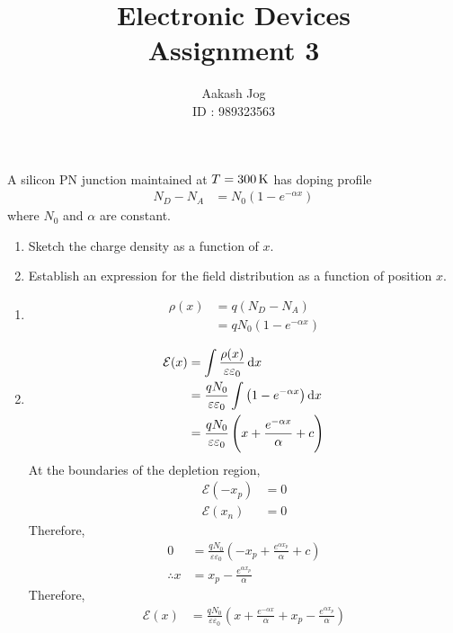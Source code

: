 \documentclass[fleqn, a4paper, 10pt, oneside]{amsart}
\title
[
	Electronic Devices : Assignment 3
]
{
	Electronic Devices\\
	Assignment 3
}
\author
{
	Aakash Jog\\
	ID : 989323563
}
\date{\formatdate{31}{3}{2016}}
\theoremstyle{definition}
\theoremstyle{theorem}
\begin{document}
\maketitle

\begin{question}
	A silicon PN junction maintained at $T = 300 \kelvin$ has doping profile
	\begin{align*}
		N_D - N_A &= N_0 \left( 1 - e^{-\alpha x} \right)
	\end{align*}
	where $N_0$ and $\alpha$ are constant.
	\begin{enumerate}
		\item Sketch the charge density as a function of $x$.
		\item Establish an expression for the field distribution as a function of position $x$.
	\end{enumerate}
\end{question}

\begin{solution}
	\begin{enumerate}[leftmargin=*]
		\item
			\begin{align*}
				\rho(x) &= q (N_D - N_A)\\
				&= q N_0 \left( 1 - e^{-\alpha x} \right)
			\end{align*}
		\item
			\begin{align*}
				\mathcal{E}(x) &= \int \frac{\rho(x)}{\varepsilon \varepsilon_0} \dif x\\
				&= \frac{q N_0}{\varepsilon \varepsilon_0} \int \left( 1 - e^{-\alpha x} \right) \dif x\\
				&= \frac{q N_0}{\varepsilon \varepsilon_0} \left( x + \frac{e^{-\alpha x}}{\alpha} + c \right)
			\end{align*}
			At the boundaries of the depletion region,
			\begin{align*}
				\mathcal{E}(-x_p) &= 0\\
				\mathcal{E}(x_n) &= 0
			\end{align*}
			Therefore,
			\begin{align*}
				0 &= \frac{q N_0}{\varepsilon \varepsilon_0} \left( -x_p + \frac{e^{\alpha x_p}}{\alpha} + c \right)\\
				\therefore x &= x_p - \frac{e^{\alpha x_p}}{\alpha}
			\end{align*}
			Therefore,
			\begin{align*}
				\mathcal{E}(x) &= \frac{q N_0}{\varepsilon \varepsilon_0} \left( x + \frac{e^{-\alpha x}}{\alpha} + x_p - \frac{e^{\alpha x_p}}{\alpha} \right)
			\end{align*}
	\end{enumerate}
\end{solution}
\end{document}
